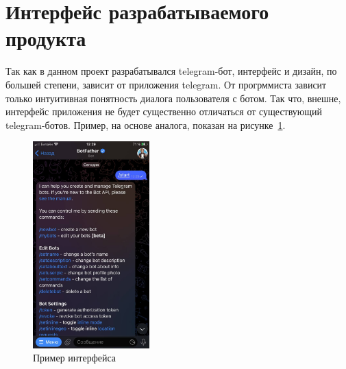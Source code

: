 \section{Интерфейс разрабатываемого продукта}
Так как в данном проект разрабатывался telegram-бот, интерфейс и дизайн,
по большей степени, зависит от приложения telegram. От прогрммиста
зависит только интуитивная понятность диалога пользователя с ботом.
Так что, внешне, интерфейс приложения не будет существенно отличаться от
существующий telegram-ботов. Пример, на основе аналога, показан
на рисунке~\ref{fig:interface:analog}.
\begin{figure}[h!tp]
	\centering
	\includegraphics[width=0.4\textwidth]{TelegramBotInterface}
	\caption{Пример интерфейса}
	\label{fig:interface:analog}
\end{figure}

